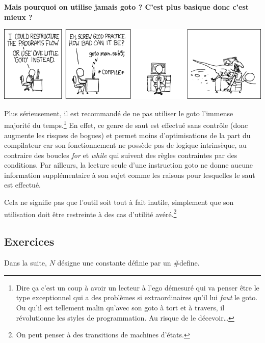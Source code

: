 \documentclass[../../../main.tex]{subfiles}
\begin{document}
\textbf{\color{red}Mais pourquoi on utilise jamais \textsf{goto} ? C'est plus basique donc c'est mieux ?}

\begin{minipage}{\textwidth}
	\begin{center}
		\includegraphics[width=\textwidth]{meme2}
	\end{center}
\end{minipage}
 
Plus sérieusement, il est recommandé de ne pas utiliser le \textsf{goto} l'immense majorité du temps.\footnote{Dire ça c'est un coup à avoir un lecteur à l'ego démesuré qui va penser être le type exceptionnel qui a des problèmes si extraordinaires qu'il lui \textit{faut} le \textsf{goto}. Ou qu'il est tellement malin qu'avec son \textsf{goto} à tort et à travers, il révolutionne les styles de programmation. Au risque de le décevoir\dots} En effet, ce genre de saut est effectué sans contrôle (donc augmente les risques de bogues) et permet moins d'optimisations de la part du compilateur car son fonctionnement ne possède pas de logique intrinsèque, au contraire des boucles \textit{for} et \textit{while} qui suivent des règles contraintes par des conditions. Par ailleurs, la lecture seule d'une instruction \textsf{goto} ne donne aucune information supplémentaire à son sujet comme les raisons pour lesquelles le saut est effectué.

Cela ne signifie pas que l'outil soit tout à fait inutile, simplement que son utilisation doit être restreinte à des cas d'utilité avéré.\footnote{On peut penser à des transitions de machines d'états.}

\subsection{Exercices}
Dans la suite, $N$ désigne une constante définie par un \textsf{\#define}.
\end{document}
